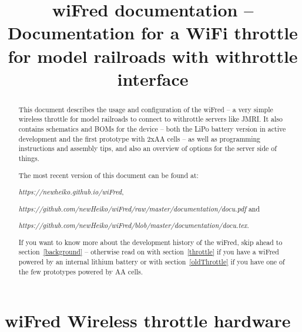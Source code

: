\documentclass[11pt,a4paper]{scrartcl}
\date{\vhCurrentDate}
\author{\vhListAllAuthors}
\title{wiFred documentation -- Documentation for a WiFi throttle for model railroads with withrottle interface}
\begin{document}
\thispagestyle{empty}
\maketitle

\begin{abstract}

  This document describes the usage and configuration of the wiFred -- a very simple wireless throttle for model railroads to connect to withrottle servers like JMRI. It also contains schematics and BOMs for the device -- both the LiPo battery version in active development and the first prototype with 2xAA cells -- as well as programming instructions and assembly tips, and also an overview of options for the server side of things.

The most recent version of this document can be found at:

\textit{https://newheiko.github.io/wiFred},

\textit{https://github.com/newHeiko/wiFred/raw/master/documentation/docu.pdf} and

\textit{https://github.com/newHeiko/wiFred/blob/master/documentation/docu.tex}.

If you want to know more about the development history of the wiFred, skip ahead to section~\ref{background} -- otherwise read on with section~\ref{throttle} if you have a wiFred powered by an internal lithium battery or with section~\ref{oldThrottle} if you have one of the few prototypes powered by AA cells.

\end{abstract}

\clearpage

\tableofcontents

\clearpage

\section{wiFred Wireless throttle hardware} \label{throttle}
\end{document}
